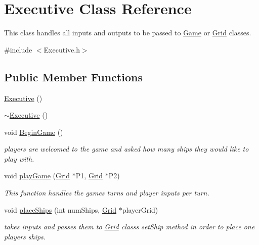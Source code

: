 \hypertarget{classExecutive}{}\section{Executive Class Reference}
\label{classExecutive}


This class handles all inputs and outputs to be passed to \hyperlink{classGame}{Game} or \hyperlink{classGrid}{Grid} classes.  




{\ttfamily \#include $<$Executive.\+h$>$}

\subsection*{Public Member Functions}
\begin{DoxyCompactItemize}
\item 
\hyperlink{classExecutive_ad870c1d741f1f313eb0c5a8336f8af6b}{Executive} ()
\item 
\hyperlink{classExecutive_a4ce80c499f7640b1770ade77cf56d965}{$\sim$\+Executive} ()
\item 
void \hyperlink{classExecutive_a1a5fd9d5a7357663b31bae642e0723d9}{Begin\+Game} ()
\begin{DoxyCompactList}\small\item\em players are welcomed to the game and asked how many ships they would like to play with. \end{DoxyCompactList}\item 
void \hyperlink{classExecutive_a671bfc107bd1a07b0a6b024778405282}{play\+Game} (\hyperlink{classGrid}{Grid} $\ast$P1, \hyperlink{classGrid}{Grid} $\ast$P2)
\begin{DoxyCompactList}\small\item\em This function handles the game\textquotesingle{}s turns and player inputs per turn. \end{DoxyCompactList}\item 
void \hyperlink{classExecutive_acff54f6827b9b21462c8c5d7fad93a13}{place\+Ships} (int num\+Ships, \hyperlink{classGrid}{Grid} $\ast$player\+Grid)
\begin{DoxyCompactList}\small\item\em takes inputs and passes them to \hyperlink{classGrid}{Grid} class\textquotesingle{}s set\+Ship method in order to place one player\textquotesingle{}s ships. \end{DoxyCompactList}\item 
\mbox{\label{classExecutive_a6b52a0ec7783ffed51d117d60781c364}} 

\end{DoxyCompactItemize}
